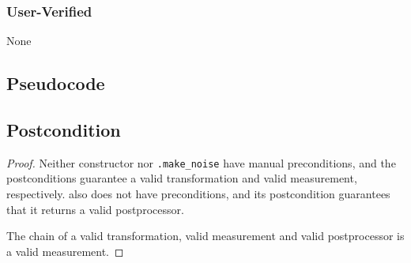 \documentclass{article}
\begin{document}
\subsubsection*{User-Verified}
None

\subsection*{Pseudocode}


\subsection*{Postcondition}
\begin{theorem}
\end{theorem}

\begin{proof}
    Neither constructor  nor
    \texttt{.make\_noise} have manual preconditions, 
    and the postconditions guarantee a valid transformation and valid measurement, respectively.
     also does not have preconditions,
    and its postcondition guarantees that it returns a valid postprocessor.

    The chain of a valid transformation, valid measurement and valid postprocessor is a valid measurement.
\end{proof}
\end{document}
